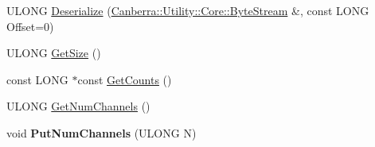 \begin{DoxyCompactItemize}
\item 
U\+L\+O\+NG \hyperlink{class_canberra_1_1_data_types_1_1_spectroscopy_1_1_spectrum_a49ea96089690bc9c4dbe010785f72252_a49ea96089690bc9c4dbe010785f72252}{Deserialize} (\hyperlink{class_canberra_1_1_utility_1_1_core_1_1_byte_stream}{Canberra\+::\+Utility\+::\+Core\+::\+Byte\+Stream} \&, const L\+O\+NG Offset=0)
\item 
U\+L\+O\+NG \hyperlink{class_canberra_1_1_data_types_1_1_spectroscopy_1_1_spectrum_a95b9306d8163e99c546cbae2afe59785_a95b9306d8163e99c546cbae2afe59785}{Get\+Size} ()
\item 
const L\+O\+NG $\ast$const \hyperlink{class_canberra_1_1_data_types_1_1_spectroscopy_1_1_spectrum_af6e97b4d0a453ddb0b3b4abe6724443c_af6e97b4d0a453ddb0b3b4abe6724443c}{Get\+Counts} ()
\item 
U\+L\+O\+NG \hyperlink{class_canberra_1_1_data_types_1_1_spectroscopy_1_1_spectrum_a426538cdb01433c840f12add63922bd9_a426538cdb01433c840f12add63922bd9}{Get\+Num\+Channels} ()
\item 
\mbox{\label{class_canberra_1_1_data_types_1_1_spectroscopy_1_1_spectrum_a0f4168ccdfe635a70231fa662cb879a4}} 
void {\bfseries Put\+Num\+Channels} (U\+L\+O\+NG N)
\end{DoxyCompactItemize}
